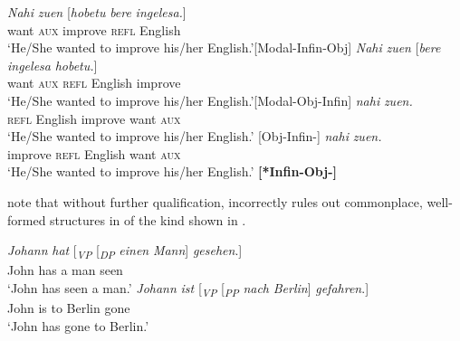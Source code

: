 \documentclass[output=paper]{langscibook}
\begin{document}
\ea \label{ex:haddican:4}
\ea \label{ex:haddican:4a} \gll  \textit{Nahi} \textit{zuen} [\textit{hobetu} \textit{bere} \textit{ingelesa.}]   \\
want \textsc{aux} improve \textsc{refl} English  \\
\glt `He/She wanted to improve his/her English.'\hfill{[Modal-Infin-Obj]}
\ex \label{ex:haddican:4b} \gll  \textit{Nahi} \textit{zuen} [\textit{bere} \textit{ingelesa} \textit{hobetu.}]    \\
want \textsc{aux} \textsc{refl} English improve \\
\glt `He/She wanted to improve his/her English.'\hfill{[Modal-Obj-Infin]}
\ex \label{ex:haddican:4c}  \textit{nahi} \textit{zuen.} \\
 \textsc{refl} English improve want \textsc{aux} \\
\glt `He/She wanted to improve his/her English.' \hfill{[Obj-Infin-]}
\ex \label{ex:haddican:4d}  \textit{nahi} \textit{zuen.}\\
improve \textsc{refl} English  want \textsc{aux} \\
\glt `He/She wanted to improve his/her English.'  \hfill{\textbf{[*Infin-Obj-]}}
\z\z

\cite{biberaueretal2014} note that without further qualification, \protect{} incorrectly rules out commonplace, well-formed structures in  of the kind shown in .

\ea \label{ex:haddican:5}
\ea \label{ex:haddican:5a} \gll \textit{Johann} \textit{hat} [\textsubscript{\textit{VP}} [\textsubscript{\textit{DP}} \textit{einen} \textit{Mann}] \textit{gesehen}.] \\
	John	has	 {} {}      a        man	  seen \\
	\glt `John has seen a man.'
\ex \label{ex:haddican:5b} \gll \textit{Johann} \textit{ist} [\textsubscript{\textit{VP}} [\textsubscript{\textit{PP}} \textit{nach} \textit{Berlin}] \textit{gefahren}.]\\ 
	John is	{} {} to Berlin gone \\
	\glt `John has gone to Berlin.' \\
	\citep{biberaueretal2014}
\z\z 
\end{document}
